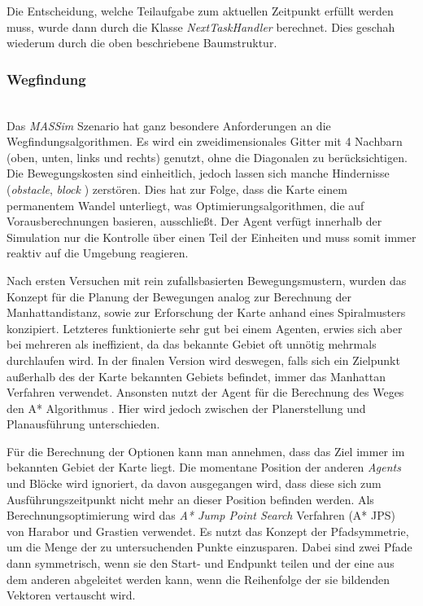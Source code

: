 Die Entscheidung, welche Teilaufgabe zum aktuellen Zeitpunkt erfüllt werden muss, wurde dann durch die Klasse \textit{NextTaskHandler} berechnet. Dies geschah wiederum durch die oben beschriebene Baumstruktur. 

\subsubsection{Wegfindung} \label{kap:wegfindung} ~\\
Das \textit{MASSim} Szenario hat ganz besondere Anforderungen an die Wegfindungsalgorithmen. Es wird ein zweidimensionales Gitter mit 4 Nachbarn (oben, unten, links und rechts) genutzt, ohne die Diagonalen zu berücksichtigen. Die Bewegungskosten sind einheitlich, jedoch lassen sich manche Hindernisse (\textit{obstacle}, \textit{block} ) zerstören. Dies hat zur Folge, dass die Karte einem permanentem Wandel unterliegt, was Optimierungsalgorithmen, die auf Vorausberechnungen basieren, ausschließt. Der Agent verfügt innerhalb der Simulation nur die Kontrolle über einen Teil der Einheiten und muss somit immer reaktiv auf die Umgebung reagieren.\newline

Nach ersten Versuchen mit rein zufallsbasierten Bewegungsmustern, wurden das Konzept für die Planung der Bewegungen analog zur Berechnung der Manhattandistanz, sowie zur Erforschung der Karte anhand eines Spiralmusters konzipiert. Letzteres funktionierte sehr gut bei einem Agenten, erwies sich aber bei mehreren als ineffizient, da das bekannte Gebiet oft unnötig mehrmals durchlaufen wird. In der finalen Version wird deswegen, falls sich ein Zielpunkt außerhalb des der Karte bekannten Gebiets befindet, immer das \glqq Manhattan \grqq{} Verfahren verwendet. Ansonsten nutzt der Agent für die Berechnung des Weges den A* Algorithmus \cite{ref_proc1}. Hier wird jedoch zwischen der Planerstellung und Planausführung unterschieden. \newline

Für die Berechnung der Optionen kann man annehmen, dass das Ziel immer im bekannten Gebiet der Karte liegt. Die momentane Position der anderen \textit{Agents} und Blöcke wird ignoriert, da davon ausgegangen wird, dass diese sich zum Ausführungszeitpunkt nicht mehr an dieser Position befinden werden. Als Berechnungsoptimierung wird das \textit{A* Jump Point Search} Verfahren (A* JPS) \cite{ref_proc2} von Harabor und Grastien verwendet. Es nutzt das Konzept der Pfadsymmetrie, um die Menge der zu untersuchenden Punkte einzusparen. Dabei sind zwei Pfade dann symmetrisch, wenn sie den Start- und Endpunkt teilen und der eine aus dem anderen abgeleitet werden kann, wenn die Reihenfolge der sie bildenden Vektoren vertauscht wird. \newline

